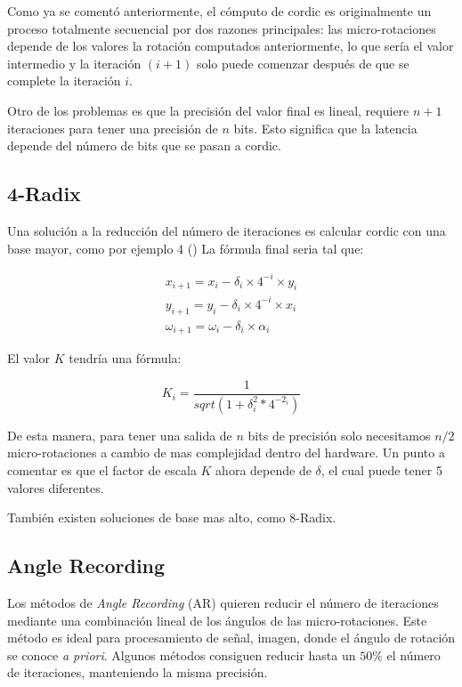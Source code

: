 Como ya se comentó anteriormente, el cómputo de \gls{cordic} es originalmente un proceso totalmente secuencial por dos razones principales: las micro-rotaciones depende de los valores la rotación computados anteriormente, lo que sería el valor intermedio y la iteración $(i+1)$ solo puede comenzar después de que se complete la iteración $i$.

Otro de los problemas es que la precisión del valor final es lineal, requiere $n+1$ iteraciones para tener una precisión de $n$ bits. Esto significa que la latencia depende del número de bits que se pasan a \gls{cordic}.

\subsection{4-Radix}
Una solución a la reducción del número de iteraciones es calcular \gls{cordic} con una base mayor, como por ejemplo 4 (\cite{antelo_high_1997}) La fórmula final seria tal que:

\[
\begin{matrix}
x_{i+1} = x_{i} - \delta_{i} \times 4^{-i} \times y_{i} \\
y_{i+1} = y_{i} - \delta_{i} \times 4^{-i} \times x_{i} \\
\omega_{i+1} =  \omega_{i} - \delta_{i} \times \alpha_{i}
\end{matrix}
\]

El valor $K$ tendría una fórmula:

\[
K_{i} = \frac{1}{sqrt{(1+\delta_i^2*4^{-2_{i}})}}
\]

De esta manera, para tener una salida de $n$ bits de precisión solo necesitamos $n/2$ micro-rotaciones a cambio de mas complejidad dentro del hardware. Un punto a comentar es que el factor de escala $K$ ahora depende de $\delta$, el cual puede tener 5 valores diferentes.

También existen soluciones de base mas alto, como 8-Radix.

\subsection{Angle Recording}
Los métodos de \textit{Angle Recording} (AR) quieren reducir el número de iteraciones mediante una combinación lineal de los ángulos de las micro-rotaciones. Este método es ideal para procesamiento de señal, imagen, donde el ángulo de rotación se conoce \textit{a priori}. Algunos métodos consiguen reducir hasta un $50\%$ el número de iteraciones, manteniendo la misma precisión. \cite{hu_angle_1993}

